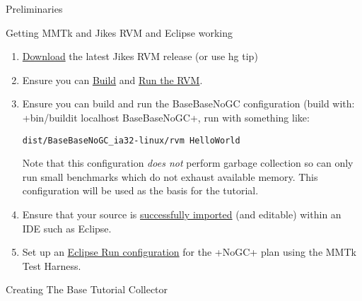 \begin{chapter}{Preliminaries}
\label{cha:preliminaries}

\begin{section}{Getting MMTk and Jikes RVM and Eclipse working}
\begin{enumerate}
  \item \hyperref[cha:getthesource]{Download} the latest Jikes RVM release (or use hg tip)
  \item Ensure you can \hyperref[cha:buildingjikesrvm]{Build} and \hyperref[cha:runningjikesrvm]{Run the RVM}.
  \item Ensure you can build and run the BaseBaseNoGC configuration (build with: \spverb+bin/buildit localhost BaseBaseNoGC+, run with something like:
    \begin{lstlisting}
dist/BaseBaseNoGC_ia32-linux/rvm HelloWorld
    \end{lstlisting}
    Note that this configuration \textit{does not} perform garbage collection so can only run small benchmarks which do not exhaust available memory. This configuration will be used as the basis for the tutorial.
  \item Ensure that your source is \hyperref[sec:editingjikesrvminanide]{successfully imported} (and editable) within an IDE such as Eclipse.
  \item Set up an \hyperref[cha:themmtktestharness]{Eclipse Run configuration} for the \spverb+NoGC+ plan using the MMTk Test Harness.
\end{enumerate}

\end{section}

\begin{section}{Creating The Base Tutorial Collector}


\end{section}
\end{chapter}
